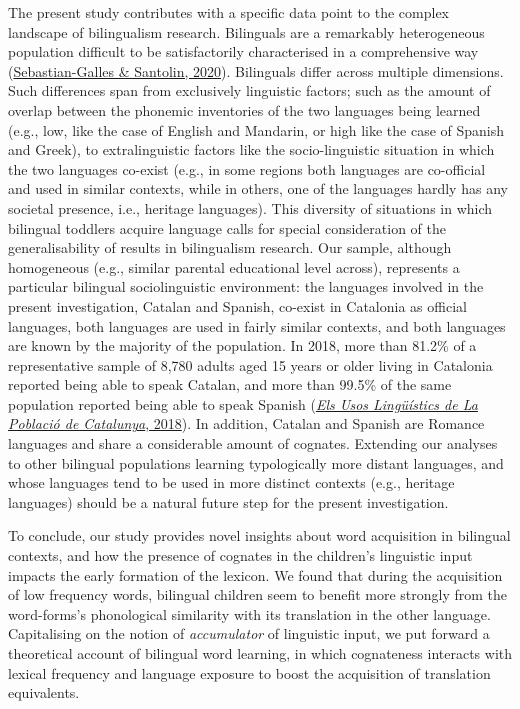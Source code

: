 \documentclass[
]{article}
\begin{document}
The present study contributes with a specific data point to the complex
landscape of bilingualism research. Bilinguals are a remarkably
heterogeneous population difficult to be satisfactorily characterised in
a comprehensive way
(\protect\hyperlink{ref-sebastian-galles2020bilingual}{Sebastian-Galles
\& Santolin, 2020}). Bilinguals differ across multiple dimensions. Such
differences span from exclusively linguistic factors; such as the amount
of overlap between the phonemic inventories of the two languages being
learned (e.g., low, like the case of English and Mandarin, or high like
the case of Spanish and Greek), to extralinguistic factors like the
socio-linguistic situation in which the two languages co-exist (e.g., in
some regions both languages are co-official and used in similar
contexts, while in others, one of the languages hardly has any societal
presence, i.e., heritage languages). This diversity of situations in
which bilingual toddlers acquire language calls for special
consideration of the generalisability of results in bilingualism
research. Our sample, although homogeneous (e.g., similar parental
educational level across), represents a particular bilingual
sociolinguistic environment: the languages involved in the present
investigation, Catalan and Spanish, co-exist in Catalonia as official
languages, both languages are used in fairly similar contexts, and both
languages are known by the majority of the population. In 2018, more
than 81.2\% of a representative sample of 8,780 adults aged 15 years or
older living in Catalonia reported being able to speak Catalan, and more
than 99.5\% of the same population reported being able to speak Spanish
(\protect\hyperlink{ref-2018els}{\emph{Els Usos Lingüístics de La
Població de Catalunya}, 2018}). In addition, Catalan and Spanish are
Romance languages and share a considerable amount of cognates. Extending
our analyses to other bilingual populations learning typologically more
distant languages, and whose languages tend to be used in more distinct
contexts (e.g., heritage languages) should be a natural future step for
the present investigation.

To conclude, our study provides novel insights about word acquisition in
bilingual contexts, and how the presence of cognates in the children's
linguistic input impacts the early formation of the lexicon. We found
that during the acquisition of low frequency words, bilingual children
seem to benefit more strongly from the word-forms's phonological
similarity with its translation in the other language. Capitalising on
the notion of \emph{accumulator} of linguistic input, we put forward a
theoretical account of bilingual word learning, in which cognateness
interacts with lexical frequency and language exposure to boost the
acquisition of translation equivalents.
\end{document}
